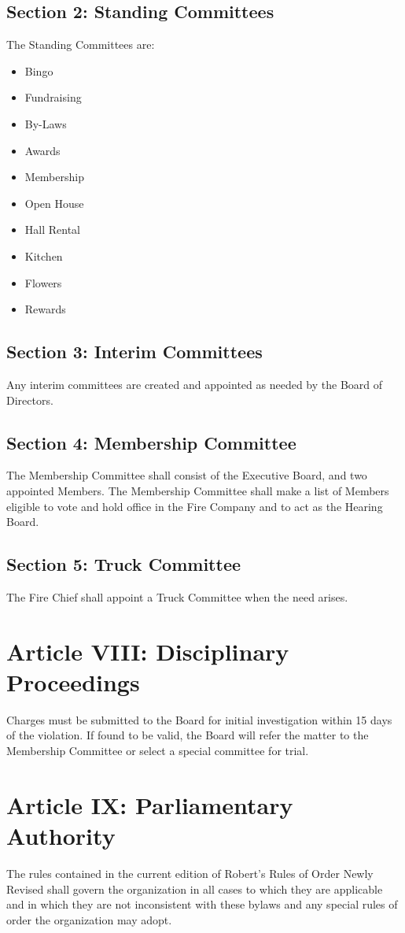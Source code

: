 ﻿\documentclass[12pt,letterpaper]{article}
\begin{document}
\subsection*{Section 2: Standing Committees}
The Standing Committees are: 
\begin{itemize}
\item Bingo 
\item Fundraising 
\item By-Laws 
\item Awards
\item Membership
\item Open House 
\item Hall Rental 
\item Kitchen 
\item Flowers
\item Rewards
\end{itemize}

\subsection*{Section 3: Interim Committees}
Any interim committees are created and appointed as needed by the Board of Directors.

\subsection*{Section 4: Membership Committee}
The Membership Committee shall consist of the Executive Board, and two appointed Members. The Membership Committee shall make a list of Members eligible to vote and hold office in the Fire Company and to act as the Hearing Board.

\subsection*{Section 5: Truck Committee}
The Fire Chief shall appoint a Truck Committee when the need arises.

\section*{Article VIII: Disciplinary Proceedings}
Charges must be submitted to the Board for initial investigation within 15 days of the violation.  If found to be valid, the Board will refer the matter to the Membership Committee or select a special committee for trial.

\section*{Article IX: Parliamentary Authority}
The rules contained in the current edition of Robert's Rules of Order Newly Revised shall govern the organization in all cases to which they are applicable and in which they are not inconsistent with these bylaws and any special rules of order the organization may adopt.
\end{document}
